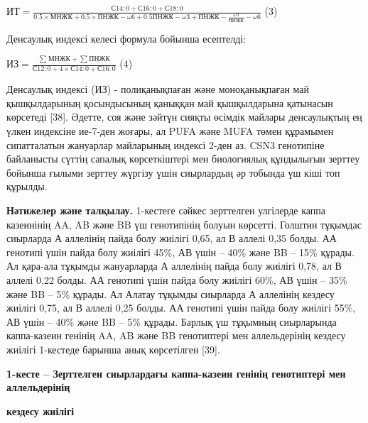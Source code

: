 \(ИТ = \frac{С14:0 + С16:0 + С18:0}{0.5 \times МНЖК + 0.5 \times ПНЖК - \omega 6 + 0.5ПНЖК - \omega 3 + ПНЖК - \frac{\omega 3}{ПНЖК} - \omega 6}\)
(3)

Денсаулық индексі келесі формула бойынша есептелді:

\(ИЗ = \frac{\sum_{}^{}{МНЖК + \sum_{}^{}{ПНЖК}}}{С12:0 + 4 \times С14:0 + С16:0}\)
(4)

Денсаулық индексі (ИЗ) - полиқанықпаған және моноқанықпаған май
қышқылдарының қосындысының қаныққан май қышқылдарына қатынасын көрсетеді
{[}38{]}. Әдетте, соя және зәйтүн сияқты өсімдік майлары денсаулықтың ең
үлкен индексіне ие-7-ден жоғары, ал PUFA және MUFA төмен құрамымен
сипатталатын жануарлар майларының индексі 2-ден аз. CSN3 генотипіне
байланысты сүттің сапалық көрсеткіштері мен биологиялық құндылығын
зерттеу бойынша ғылыми зерттеу жүргізу үшін сиырлардың әр тобында үш
кіші топ құрылды.

{\bfseries Нәтижелер және талқылау.} 1-кестеге сәйкес зерттелген улгілерде
каппа казеинінің AA, AB және BB үш генотипінің болуын көрсетті. Голштин
тұқымдас сиырларда А аллелінің пайда болу жиілігі 0,65, ал В аллелі 0,35
болды. АА генотипі үшін пайда болу жиілігі 45\%, АВ үшін -- 40\% және BB
-- 15\% құрады. Ал қара-ала тұқымды жануарларда А аллелінің пайда болу
жиілігі 0,78, ал В аллелі 0,22 болды. АА генотипі үшін пайда болу
жиілігі 60\%, АВ үшін -- 35\% және BB -- 5\% құрады. Ал Алатау тұқымды
сиырларда А аллелінің кездесу жиілігі 0,75, ал В аллелі 0,25 болды. АА
генотипі үшін пайда болу жиілігі 55\%, АВ үшін -- 40\% және BB -- 5\%
құрады. Барлық үш тұқымның сиырларында каппа-казеин генінің AA, AB және
BB генотиптері мен аллельдерінің кездесу жиілігі 1-кестеде барынша анық
көрсетілген {[}39{]}.

{\bfseries 1-кесте -- Зерттелген сиырлардағы каппа-казеин генінің
генотиптері мен аллельдерінің}

{\bfseries кездесу жиілігі}


